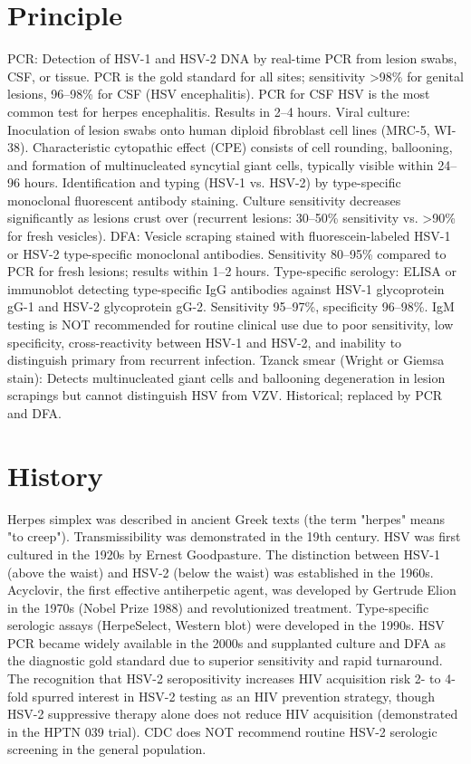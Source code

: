 \section*{Principle}
PCR: Detection of HSV-1 and HSV-2 DNA by real-time PCR from lesion swabs, CSF, or tissue. PCR is the gold standard for all sites; sensitivity >98\% for genital lesions, 96--98\% for CSF (HSV encephalitis). PCR for CSF HSV is the most common test for herpes encephalitis. Results in 2--4 hours. Viral culture: Inoculation of lesion swabs onto human diploid fibroblast cell lines (MRC-5, WI-38). Characteristic cytopathic effect (CPE) consists of cell rounding, ballooning, and formation of multinucleated syncytial giant cells, typically visible within 24--96 hours. Identification and typing (HSV-1 vs. HSV-2) by type-specific monoclonal fluorescent antibody staining. Culture sensitivity decreases significantly as lesions crust over (recurrent lesions: 30--50\% sensitivity vs. >90\% for fresh vesicles). DFA: Vesicle scraping stained with fluorescein-labeled HSV-1 or HSV-2 type-specific monoclonal antibodies. Sensitivity 80--95\% compared to PCR for fresh lesions; results within 1--2 hours. Type-specific serology: ELISA or immunoblot detecting type-specific IgG antibodies against HSV-1 glycoprotein gG-1 and HSV-2 glycoprotein gG-2. Sensitivity 95--97\%, specificity 96--98\%. IgM testing is NOT recommended for routine clinical use due to poor sensitivity, low specificity, cross-reactivity between HSV-1 and HSV-2, and inability to distinguish primary from recurrent infection. Tzanck smear (Wright or Giemsa stain): Detects multinucleated giant cells and ballooning degeneration in lesion scrapings but cannot distinguish HSV from VZV. Historical; replaced by PCR and DFA.

\section*{History}
Herpes simplex was described in ancient Greek texts (the term "herpes" means "to creep"). Transmissibility was demonstrated in the 19th century. HSV was first cultured in the 1920s by Ernest Goodpasture. The distinction between HSV-1 (above the waist) and HSV-2 (below the waist) was established in the 1960s. Acyclovir, the first effective antiherpetic agent, was developed by Gertrude Elion in the 1970s (Nobel Prize 1988) and revolutionized treatment. Type-specific serologic assays (HerpeSelect, Western blot) were developed in the 1990s. HSV PCR became widely available in the 2000s and supplanted culture and DFA as the diagnostic gold standard due to superior sensitivity and rapid turnaround. The recognition that HSV-2 seropositivity increases HIV acquisition risk 2- to 4-fold spurred interest in HSV-2 testing as an HIV prevention strategy, though HSV-2 suppressive therapy alone does not reduce HIV acquisition (demonstrated in the HPTN 039 trial). CDC does NOT recommend routine HSV-2 serologic screening in the general population.

